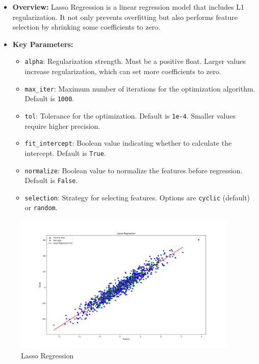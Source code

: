 \begin{itemize}
    \item \textbf{Overview:} Lasso Regression is a linear regression model that includes L1 regularization. It not only prevents overfitting but also performs feature selection by shrinking some coefficients to zero.
    \item \textbf{Key Parameters:}
    \begin{itemize}
        \item \texttt{alpha}: Regularization strength. Must be a positive float. Larger values increase regularization, which can set more coefficients to zero.
        \item \texttt{max\_iter}: Maximum number of iterations for the optimization algorithm. Default is \texttt{1000}.
        \item \texttt{tol}: Tolerance for the optimization. Default is \texttt{1e-4}. Smaller values require higher precision.
        \item \texttt{fit\_intercept}: Boolean value indicating whether to calculate the intercept. Default is \texttt{True}.
        \item \texttt{normalize}: Boolean value to normalize the features before regression. Default is \texttt{False}.
        \item \texttt{selection}: Strategy for selecting features. Options are \texttt{cyclic} (default) or \texttt{random}.
    \end{itemize}
\end{itemize}

\begin{figure}[H]
	\centering
	\includegraphics[width=0.95\textwidth]{./Images/Lasso-Regression.png}
	\caption{Lasso Regression}
	\label{fig:lasso-regression}
\end{figure}

